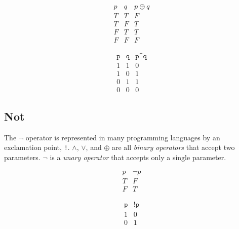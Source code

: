 \documentclass{book}
\begin{document}
\begin{multicols}{2}

\begin{equation*}
\begin{array}{c|c|c}
p & q & p \oplus q \\
\hline
T & T & F \\
T & F & T \\
F & T & T \\
F & F & F
\end{array}
\end{equation*}

\begin{equation*}
\begin{array}{c|c|c}
\texttt{p} & \texttt{q} & \texttt{p\textasciicircum q} \\
\hline
1 & 1 & 0 \\
1 & 0 & 1 \\
0 & 1 & 1 \\
0 & 0 & 0
\end{array}
\end{equation*}

\end{multicols}

\subsection{Not}

The $\neg$ operator is represented in many programming languages by an exclamation point, \texttt{!}. $\wedge$, $\vee$, and $\oplus$ are all \textit{binary operators} that accept two parameters. $\neg$ is a \textit{unary operator} that accepts only a single parameter.

\begin{multicols}{2}

\begin{equation*}
\begin{array}{c|c}
p & \neg p \\
\hline
T & F \\
F & T
\end{array}
\end{equation*}

\begin{equation*}
\begin{array}{c|c}
\texttt{p} & \texttt{!p} \\
\hline
1 & 0 \\
0 & 1
\end{array}
\end{equation*}

\end{multicols}
\end{document}
